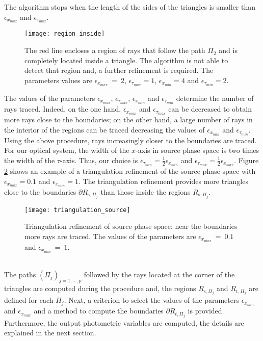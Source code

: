 The algorithm stops when the length of the sides of the triangles is smaller than $\epsilon_{x_{max}}$ and $\epsilon_{\tau_{max}}$.
\begin{figure}[h]
  \begin{center}
  \texttt{[image: region\_inside]}
  \end{center}
  \caption{The red line encloses a region of rays that follow the path $\Pi_2$ and is completely located inside a triangle.
  The algorithm is not able to detect that region and, a further refinement is required.
    The parameters values are $\epsilon_{x_{max}}~=~ 2$, $\epsilon_{\tau_{max}}= 1$, $\epsilon_{x_{min}}= 4$ and $\epsilon_{\tau_{min}}=2$. }
   \label{fig:region inside}
  \end{figure}
The values of the parameters $\epsilon_{x_{max}}$, $\epsilon_{\tau_{max}}$, $\epsilon_{x_{min}}$ and $\epsilon_{\tau_{min}}$ determine the number of rays traced.
Indeed, on the one hand, $\epsilon_{x_{max}}$ and $\epsilon_{\tau_{max}}$ can be decreased to obtain more rays close to the boundaries;
on the other hand, a large number of rays in the interior of the regions can be traced decreasing the values of $\epsilon_{x_{min}}$ and $\epsilon_{\tau_{min}}$. %
\newline
\indent Using the above procedure, rays increasingly closer to the boundaries are traced.
For our optical system, the width of the $x$-axis in source phase space is two times the width of the $\tau$-axis.
Thus, our choice is $\epsilon_{\tau_{min}}=\frac{1}{2}\epsilon_{x_{min}}$ and $\epsilon_{\tau_{max}} = \frac{1}{2}\epsilon_{x_{max}}$.
Figure \ref{fig:triangulation_refinement} shows an example of a triangulation refinement of the source phase space with $\epsilon_{x_{max}}=0.1$ and $\epsilon_{x_{min}}=1$.
The triangulation refinement provides more triangles close to the boundaries $\partial R_{\textrm{s}, \Pi_j}$ than those inside the regions $R_{\textrm{s}, \Pi_j}$.
\begin{figure}[h]
  \begin{center}
  \texttt{[image: triangulation\_source]}
  \end{center}
  \caption{Triangulation refinement of source phase space:
  near the boundaries more rays are traced.
    The values of the parameters are $\epsilon_{x_{max}}~=~ 0.1$ and $\epsilon_{x_{min}}~=~1$.}
   \label{fig:triangulation_refinement}
  \end{figure}
 \\ \indent The paths $(\Pi_j)_{j = 1, \cdots, p}$ followed by the rays located at the corner of the triangles are computed during the procedure and, the regions
 $R_{\textrm{s}, \Pi_j}$ and $R_{\textrm{t}, \Pi_j}$ are defined for each $\Pi_j$.
Next, a criterion to select the values of the parameters $\epsilon_{x_{min}}$ and $\epsilon_{x_{max}}$ and a method to compute the boundaries $\partial{R_{t, \Pi_j}}$ is provided.
Furthermore, the output photometric variables are computed, the details are explained in the next section.



